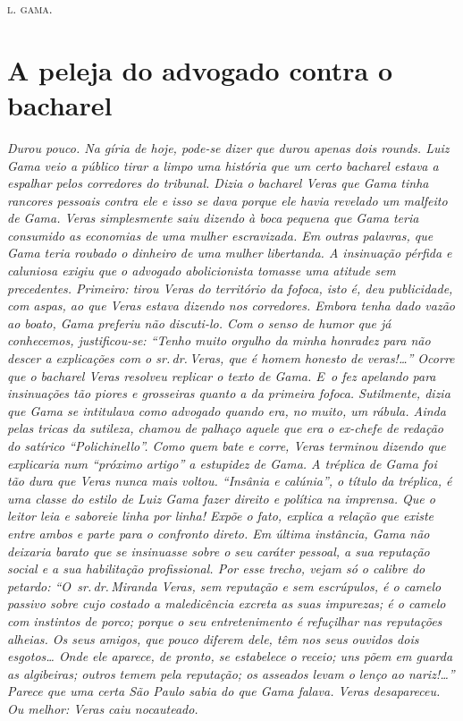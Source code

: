 \hfill\textsc{l. gama.}

\part{A peleja do advogado contra o bacharel}

\begin{didas}
\emph{Durou pouco. Na gíria de hoje, pode-se dizer que durou apenas dois
rounds. Luiz Gama veio a público tirar a limpo uma história que um certo
bacharel estava a espalhar pelos corredores do tribunal. Dizia o
bacharel Veras que Gama tinha rancores pessoais contra ele e isso se
dava porque ele havia revelado um malfeito de Gama. Veras simplesmente
saiu dizendo à boca pequena que Gama teria consumido as economias de uma
mulher escravizada. Em outras palavras, que Gama teria roubado o
dinheiro de uma mulher libertanda. A insinuação pérfida e caluniosa
exigiu que o advogado abolicionista tomasse uma atitude sem precedentes.
Primeiro: tirou Veras do território da fofoca, isto é, deu publicidade,
com aspas, ao que Veras estava dizendo nos corredores. Embora tenha dado
vazão ao boato, Gama preferiu não discuti-lo. Com o senso de humor que
já conhecemos, justificou-se: ``Tenho muito orgulho da minha honradez
para não descer a explicações com o sr.\,dr.\,Veras, que é homem honesto
de veras!\ldots{}'' Ocorre que o bacharel Veras resolveu replicar o texto de
Gama. E~o fez apelando para insinuações tão piores e grosseiras quanto a
da primeira fofoca. Sutilmente, dizia que Gama se intitulava como
advogado quando era, no muito, um rábula. Ainda pelas tricas da
sutileza, chamou de palhaço aquele que era o ex-chefe de redação do
satírico ``Polichinello''. Como quem bate e corre, Veras terminou
dizendo que explicaria num ``próximo artigo'' a estupidez de Gama. A
tréplica de Gama foi tão dura que Veras nunca mais voltou. ``Insânia e
calúnia'', o título da tréplica, é uma classe do estilo de Luiz
Gama fazer direito e política na imprensa. Que o leitor leia e saboreie
linha por linha! Expõe o fato, explica a relação que existe entre ambos
e parte para o confronto direto. Em última instância, Gama não deixaria
barato que se insinuasse sobre o seu caráter pessoal, a sua reputação
social e a sua habilitação profissional. Por esse trecho, vejam só o
calibre do petardo: ``O~sr.\,dr.\,Miranda Veras, sem reputação e sem
escrúpulos, é o camelo passivo sobre cujo costado a maledicência excreta
as suas impurezas; é o camelo com instintos de porco; porque o seu
entretenimento é refuçilhar nas reputações alheias. Os seus amigos, que
pouco diferem dele, têm nos seus ouvidos dois esgotos\ldots{} Onde ele
aparece, de pronto, se estabelece o receio; uns põem em guarda as
algibeiras; outros temem pela reputação; os asseados levam o lenço ao
nariz!\ldots{}'' Parece que uma certa São Paulo sabia do que Gama falava.
Veras desapareceu. Ou melhor: Veras caiu nocauteado. }
\end{didas}

